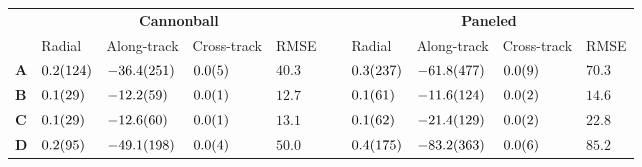 \begin{tabular}{llllllllll}
\toprule
 & \multicolumn{4}{c}{\bfseries Cannonball} & \bfseries  & \multicolumn{4}{c}{\bfseries Paneled} \\
 & Radial & Along-track & Cross-track & RMSE &  & Radial & Along-track & Cross-track & RMSE \\
\cmidrule{2-5}\cmidrule{7-10}
\bfseries A & $\num{+0.2 \pm 12.4}$ & $\num{-36.4 \pm 25.1}$ & $\num{+0.0 \pm 0.5}$ & $\num{40.3}$ & ~ & $\num{+0.3 \pm 23.7}$ & $\num{-61.8 \pm 47.7}$ & $\num{+0.0 \pm 0.9}$ & $\num{70.3}$ \\
\bfseries B & $\num{+0.1 \pm 2.9}$ & $\num{-12.2 \pm 5.9}$ & $\num{+0.0 \pm 0.1}$ & $\num{12.7}$ & ~ & $\num{+0.1 \pm 6.1}$ & $\num{-11.6 \pm 12.4}$ & $\num{+0.0 \pm 0.2}$ & $\num{14.6}$ \\
\bfseries C & $\num{+0.1 \pm 2.9}$ & $\num{-12.6 \pm 6.0}$ & $\num{+0.0 \pm 0.1}$ & $\num{13.1}$ & ~ & $\num{+0.1 \pm 6.2}$ & $\num{-21.4 \pm 12.9}$ & $\num{+0.0 \pm 0.2}$ & $\num{22.8}$ \\
\bfseries D & $\num{+0.2 \pm 9.5}$ & $\num{-49.1 \pm 19.8}$ & $\num{+0.0 \pm 0.4}$ & $\num{50.0}$ & ~ & $\num{+0.4 \pm 17.5}$ & $\num{-83.2 \pm 36.3}$ & $\num{+0.0 \pm 0.6}$ & $\num{85.2}$ \\
\bottomrule
\end{tabular}
